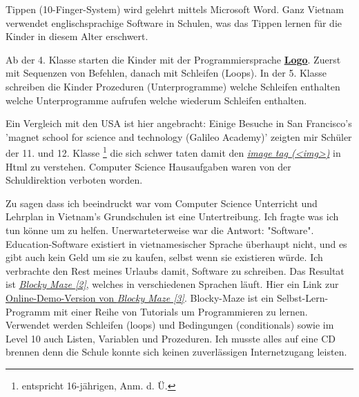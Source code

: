 Tippen (10-Finger-System) wird gelehrt mittels Microsoft Word. Ganz Vietnam verwendet englischsprachige Software in Schulen, was das Tippen lernen für die Kinder in diesem Alter erschwert.

Ab der 4. Klasse starten die Kinder mit der Programmiersprache \href{http://de.wikipedia.org/wiki/Logo_(Programmiersprache)}{\textbf{Logo}}. Zuerst mit Sequenzen von Befehlen, danach mit Schleifen (Loops). In der 5. Klasse schreiben die Kinder Prozeduren (Unterprogramme) welche Schleifen enthalten welche Unterprogramme aufrufen welche wiederum Schleifen enthalten.

Ein Vergleich mit den USA ist hier angebracht: Einige Besuche in San Francisco's 'magnet school for science and technology (Galileo Academy)' zeigten mir Schüler der 11. und 12. Klasse \footnote{entspricht 16-jährigen, Anm. d. Ü.} die sich schwer taten damit den \href{http://de.selfhtml.org/html/grafiken/einbinden.htm#referenz}{\textit{image tag (<img>)}} in Html zu verstehen. Computer Science Hausaufgaben waren von der Schuldirektion verboten worden.

Zu sagen dass ich beeindruckt war vom Computer Science Unterricht und Lehrplan in Vietnam's Grundschulen ist eine Untertreibung. Ich fragte was ich tun könne um zu helfen. Unerwarteterweise war die Antwort: "Software". Education-Software existiert in vietnamesischer Sprache überhaupt nicht, und es gibt auch kein Geld um sie zu kaufen, selbst wenn sie existieren würde.  Ich verbrachte den Rest meines Urlaubs damit, Software zu schreiben. Das Resultat ist \href{https://code.google.com/p/blockly/}{\textit{Blocky Maze [2]}}, welches in verschiedenen Sprachen läuft. Hier ein Link zur \href{http://blockly-demo.appspot.com/static/apps/maze/en.html?level=1}{Online-Demo-Version von \textit{Blocky Maze [3]}}. Blocky-Maze ist ein Selbst-Lern-Programm mit einer Reihe von Tutorials um Programmieren zu lernen. Verwendet werden Schleifen (loops) und Bedingungen (conditionals) sowie im Level 10 auch Listen, Variablen und Prozeduren. Ich musste alles auf eine CD brennen denn die Schule konnte sich keinen zuverlässigen Internetzugang leisten.

